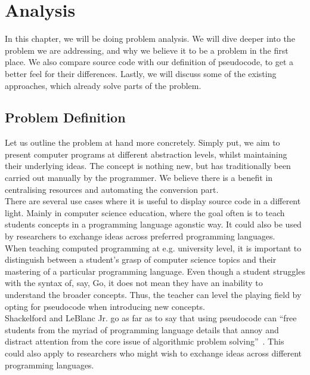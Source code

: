 \chapter{Analysis}

In this chapter, we will be doing problem analysis. We will dive deeper into the problem we are addressing, and why we believe it to be a problem in the first place. We also compare source code with our definition of pseudocode, to get a better feel for their differences. Lastly, we will discuss some of the existing approaches, which already solve parts of the problem.

\section{Problem Definition}

Let us outline the problem at hand more concretely. Simply put, we aim to present computer programs at different abstraction levels, whilst maintaining their underlying ideas. The concept is nothing new, but has traditionally been carried out manually by the programmer. We believe there is a benefit in centralising resources and automating the conversion part. \\

There are several use cases where it is useful to display source code in a different light. Mainly in computer science education, where the goal often is to teach students concepts in a programming language agonstic way. It could also be used by researchers to exchange ideas across preferred programming languages. \\

When teaching computed programming at e.g. university level, it is important to distinguish between a student's grasp of computer science topics and their mastering of a particular programming language. Even though a student struggles with the syntax of, say, Go, it does not mean they have an inability to understand the broader concepts. Thus, the teacher can level the playing field by opting for pseudocode when introducing new concepts. \\

Shackelford and LeBlanc Jr. go as far as to say that using pseudocode can ``free students from the myriad of programming language details that annoy and distract attention from the core issue of algorithmic problem solving''~\cite{dislikeProgLang}. This could also apply to researchers who might wish to exchange ideas across different programming languages. \\

